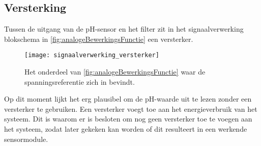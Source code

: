\subsection{Versterking}\label{sec:versterking}
Tussen de uitgang van de pH-sensor en het filter zit in het signaalverwerking blokschema in \cref{fig:analogeBewerkingsFunctie} een versterker.

\begin{figure}[!htb]
    \centering
    \texttt{[image: signaalverwerking\_versterker]}
    \caption{Het onderdeel van \cref{fig:analogeBewerkingsFunctie} waar de spanningsreferentie zich in bevindt.}
    \label{fig:versterkerInSchema}
\end{figure}

Op dit moment lijkt het erg plausibel om de pH-waarde uit te lezen zonder een versterker te gebruiken. Een versterker voegt toe aan het energieverbruik van het systeem. Dit is waarom er is besloten om nog geen versterker toe te voegen aan het systeem, zodat later gekeken kan worden of dit resulteert in een werkende sensormodule.